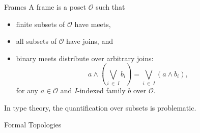 \documentclass[xcolor={dvipsnames}]{beamer}
\begin{document}
\begin{frame}{Frames}
  A \alert{frame} is a poset $\mathcal{O}$ such that
  \begin{itemize}
    \item \alert{finite subsets} of $\mathcal{O}$ have \alert{meets},
    \item \alert{all subsets} of $\mathcal{O}$ have \alert{joins}, and
    \item binary meets distribute over arbitrary joins:
      \begin{equation*}
        a \wedge \left( \bigvee_{i~\in~I} b_i \right) = \bigvee_{i~\in~I} \left( a \wedge b_i \right),
      \end{equation*}
      for any $a \in \mathcal{O}$ and $I$-indexed family $b$ over $\mathcal{O}$.
  \end{itemize}

  {\large
    In \alert{type theory}, the quantification over subsets is problematic.
  }
\end{frame}

\begin{frame}{Formal Topologies}
  
\end{frame}
\end{document}
